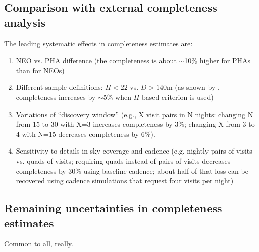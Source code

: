 \subsection{Comparison with external completeness analysis}

The leading systematic effects in completeness estimates are: 
\begin{enumerate}
\item NEO vs. PHA difference (the completeness is about $\sim$10\% higher for PHAs than for NEOs) 
\item Different sample definitions: $H<22$ vs. $D>140$m (as shown by \citep{GMS2016}, completeness increases by $\sim$5\% when $H$-based criterion is used) 
\item Variations of ``discovery window'' (e.g., X visit pairs in N nights: changing N from 15 to 30 with X=3 increases
          completeness by 3\%; changing X from 3 to 4 with N=15 decreases completeness by 6\%). 
\item Sensitivity to details in sky coverage and cadence (e.g. nightly pairs of visits vs. quads of visits;
          requiring quads instead of pairs of visits decreases completeness by 30\% using baseline cadence; 
          about half of that loss can be recovered using cadence simulations that request four visits per night) 
\end{enumerate}          
    
\subsection{Remaining uncertainties in completeness estimates}

Common to all, really.          

